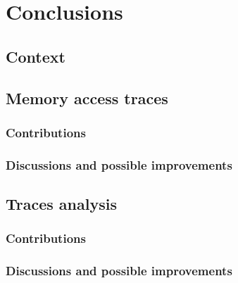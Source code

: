 \chapter{Conclusions}

\section{Context}

\section{Memory access traces}

\subsection{Contributions}
\subsection{Discussions and possible improvements}

\section{Traces analysis}

\subsection{Contributions}
\subsection{Discussions and possible improvements}
